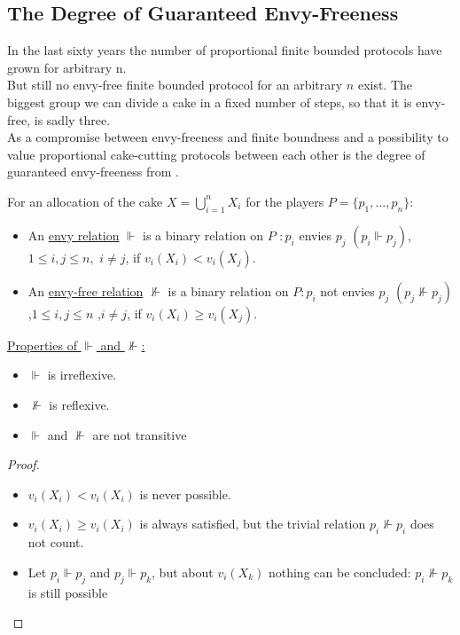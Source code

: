 \subsection{The Degree of Guaranteed Envy-Freeness}
In the last sixty years the number of proportional finite bounded protocols have grown for arbitrary n.\\But still no envy-free finite bounded protocol for an arbitrary $n$ exist. The biggest group we can divide a cake in a fixed number of steps, so that it is envy-free, is sadly three.\\ As a compromise between envy-freeness and finite boundness and a possibility to value proportional cake-cutting protocols between each other is the degree of guaranteed envy-freeness from \cite{lindner:degrees}. 

\begin{defi}
 For an allocation of the cake $X=\bigcup\limits_{i=1}^n X_i$ for the players $P=\{p_1,\dots,p_n\}$:
 \begin{itemize}
  \item An \underline{envy relation} $\Vdash$ is a binary relation on $P$ %
  $:p_i$ envies 
        $p_j$ $(p_i\Vdash p_j)$, $1\leq i,j\leq n,$ $i\neq j$, if $v_i(X_i)<v_i(X_j)$.
  \item An \underline{envy-free relation} $\nVdash$ is a binary relation on $P:p_i$ not envies $p_j$ $(p_j
        \nVdash p_j)$ ,$1\leq i,j\leq n$ ,$i\neq j$, if $v_i(X_i)\geq v_i(X_j)$.
 \end{itemize}
\end{defi}
\underline{Properties of $\Vdash$ and $\nVdash$:}
\begin{itemize}
 \item $\Vdash$ is irreflexive.
 \item $\nVdash$ is reflexive.
 \item $\Vdash$ and $\nVdash$ are not transitive
 \end{itemize}
\begin{proof}
	\begin{itemize}
 		\item $v_i(X_i)<v_i(X_i)$ is never possible.
 		\item $v_i(X_i)\geq v_i(X_i)$ is always satisfied, but the trivial relation $p_i \nVdash p_i$ does not count.
 		\item Let $p_i\Vdash p_j$ and $p_j\Vdash p_k$, but about $v_i(X_k)$ nothing can be concluded: $p_i\nVdash p_k$ is still possible
	\end{itemize}
\end{proof}
